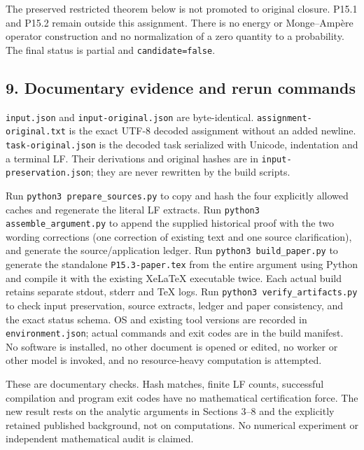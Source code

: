 \documentclass[11pt]{article}
\begin{document}
The preserved restricted theorem below is not promoted to original closure. P15.1 and P15.2 remain outside this assignment. There is no energy or Monge–Ampère operator construction and no normalization of a zero quantity to a probability. The final status is partial and \texttt{candidate=\allowbreak{}false}.

\subsection{9. Documentary evidence and rerun commands}

\texttt{input.json} and \texttt{input-\allowbreak{}original.json} are byte-\allowbreak{}identical. \texttt{assignment-\allowbreak{}original.txt} is the exact UTF-\allowbreak{}8 decoded assignment without an added newline. \texttt{task-\allowbreak{}original.json} is the decoded task serialized with Unicode, indentation and a terminal LF. Their derivations and original hashes are in \texttt{input-\allowbreak{}preservation.json}; they are never rewritten by the build scripts.

Run \texttt{python3 prepare\_\allowbreak{}sources.py} to copy and hash the four explicitly allowed caches and regenerate the literal LF extracts. Run \texttt{python3 assemble\_\allowbreak{}argument.py} to append the supplied historical proof with the two wording corrections (one correction of existing text and one source clarification), and generate the source/\allowbreak{}application ledger. Run \texttt{python3 build\_\allowbreak{}paper.py} to generate the standalone \texttt{P15.3-\allowbreak{}paper.tex} from the entire argument using Python and compile it with the existing XeLaTeX executable twice. Each actual build retains separate stdout, stderr and TeX logs. Run \texttt{python3 verify\_\allowbreak{}artifacts.py} to check input preservation, source extracts, ledger and paper consistency, and the exact status schema. OS and existing tool versions are recorded in \texttt{environment.json}; actual commands and exit codes are in the build manifest. No software is installed, no other document is opened or edited, no worker or other model is invoked, and no resource-\allowbreak{}heavy computation is attempted.

These are documentary checks. Hash matches, finite LF counts, successful compilation and program exit codes have no mathematical certification force. The new result rests on the analytic arguments in Sections 3–8 and the explicitly retained published background, not on computations. No numerical experiment or independent mathematical audit is claimed.
\end{document}
